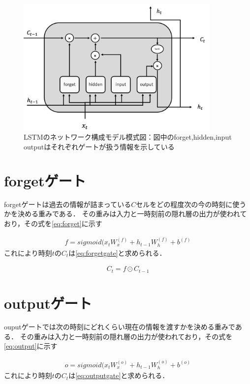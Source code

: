 \documentclass[a4j,11pt,report]{jsbook}
\begin{document}
\begin{figure}[H]
  \centering
  \includegraphics[width = 100mm]{image/lstm_simple_image.png}
  \caption{LSTMのネットワーク構成モデル模式図：図中のforget,hidden,input outputはそれぞれゲートが扱う情報を示している }
  \label{fig:LSTM_Simple}
\end{figure}

\section{forgetゲート\label{sec:forget}}
forgetゲートは過去の情報が詰まっている$C$セルをどの程度次の今の時刻に使うかを決める重みである．
その重みは入力と一時刻前の隠れ層の出力が使われており，その式を\ref{eq:forget}に示す

\begin{equation}
  \label{eq:forget}
  \begin{split}
    f = sigmoid(x_{t}W_{x}^{(f)} + h_{t-1}W_{h}^{(f)} + b^{(f)}
  \end{split}
\end{equation}
これにより時刻$t$の$C_{t}$は\ref{eq:forgetgate}と求められる．

\begin{equation}
  \label{eq:forgetgate}
  \begin{split}
    C_{t} = f \odot C_{t-1}
  \end{split}
\end{equation}


\section{outputゲート\label{sec:output}}
ouputゲートでは次の時刻にどれくらい現在の情報を渡すかを決める重みである．
その重みは入力と一時刻前の隠れ層の出力が使われており，その式を\ref{eq:output}に示す


\begin{equation}
  \label{eq:output}
  \begin{split}
    o = sigmoid(x_{t}W_{x}^{(o)} + h_{t-1}W_{h}^{(o)} + b^{(o)}
  \end{split}
\end{equation}
これにより時刻$t$の$C_{t}$は\ref{eq:outputgate}と求められる．
\end{document}
